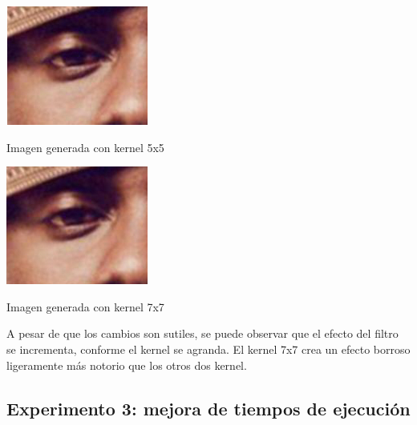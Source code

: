 \documentclass[conference]{IEEEtran}
\begin{document}
\begin{center}
\includegraphics{cincoZOOM.jpg}\newline
\caption{Imagen generada con kernel 5x5}
\end{center}\newline\newline


\begin{center}
\includegraphics{sieteZOOM.jpg}\newline
\caption{Imagen generada con kernel 7x7}
\end{center}\newline
\newline

A pesar de que los cambios son sutiles, se puede observar que el efecto del filtro se incrementa, conforme el kernel se agranda. El kernel 7x7 crea un efecto borroso ligeramente más notorio que los otros dos kernel. \newline




\subsection{Experimento 3: mejora de tiempos de ejecución}
\end{document}
